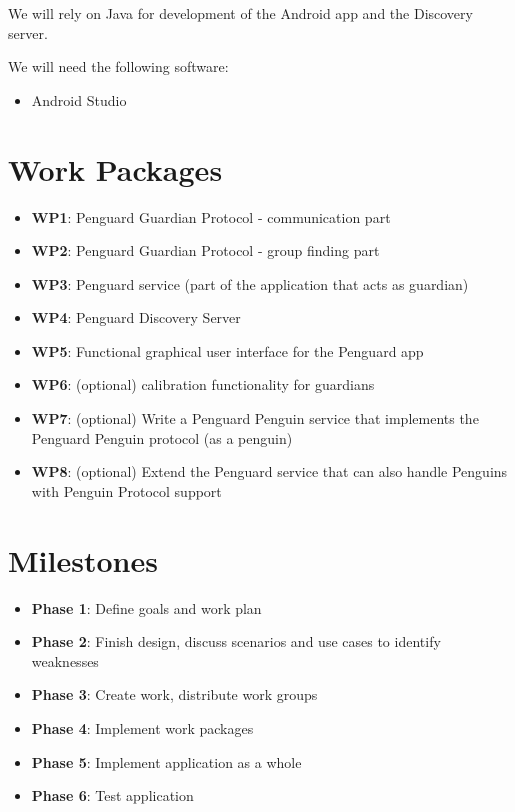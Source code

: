 \documentclass{report}
\begin{document}
We will rely on Java for development of the Android app and the Discovery server.

We will need the following software:

\begin{itemize}
    \item Android Studio
\end{itemize}


\section{Work Packages}

\begin{itemize}
        \item {\bf WP1}: Penguard Guardian Protocol - communication part
        \item {\bf WP2}: Penguard Guardian Protocol - group finding part
        \item {\bf WP3}: Penguard service (part of the application that acts as guardian)
        \item {\bf WP4}: Penguard Discovery Server
        \item {\bf WP5}: Functional graphical user interface for the Penguard app
        \item {\bf WP6}: (optional) calibration functionality for guardians
        \item {\bf WP7}: (optional) Write a Penguard Penguin service that implements the Penguard Penguin protocol (as a penguin)
        \item {\bf WP8}: (optional) Extend the Penguard service that can also handle Penguins with Penguin Protocol support
\end{itemize}
 

\section{Milestones}

\begin{itemize}
    \item \textbf{Phase 1}: Define goals and work plan
    \item \textbf{Phase 2}: Finish design, discuss scenarios and use cases to identify weaknesses
    \item \textbf{Phase 3}: Create work, distribute work groups
    \item \textbf{Phase 4}: Implement work packages
    \item \textbf{Phase 5}: Implement application as a whole
    \item \textbf{Phase 6}: Test application
\end{itemize}
\end{document}
